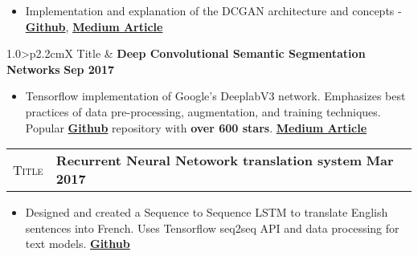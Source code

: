 \documentclass[9pt, a4paper, oneside, final]{scrartcl} %
\newcommand{\gray}{\rowcolor[gray]{.90}} %
\begin{document}

\begin{itemize}\itemsep1.2pt \parskip0pt 
\item Implementation and explanation of the DCGAN architecture and concepts - \textbf{\href{https://github.com/sthalles/blog-resources/tree/master/dcgan}{Github}}, \textbf{\href{https://medium.com/free-code-camp/an-intuitive-introduction-to-generative-adversarial-networks-gans-7a2264a81394}{Medium Article}} 
\end{itemize}

\begin{center}
\begin{tabularx}{1.0\linewidth}{>{\raggedleft\scshape}p{2.2cm}X}
\gray Title & \textbf{Deep Convolutional Semantic Segmentation Networks} \hfill \textbf{Sep 2017}\\
\end{tabularx}
\end{center}

\begin{itemize}\itemsep1.2pt \parskip0pt 
\item Tensorflow implementation of Google’s DeeplabV3 network. Emphasizes best practices of data pre-processing, augmentation, and training techniques. Popular \textbf{\href{https://github.com/sthalles/deeplab_v3}{Github}} repository with \textbf{over 600 stars}. \textbf{\href{https://medium.com/free-code-camp/diving-into-deep-convolutional-semantic-segmentation-networks-and-deeplab-v3-4f094fa387df?source=friends_link&sk=79233e6fd63ef6ea2578d5577eb00666}{Medium Article}}
\end{itemize}

\begin{center}
\begin{tabularx}{1.0\linewidth}{>{\raggedleft\scshape}p{2.2cm}X}
\gray Title & \textbf{Recurrent Neural Netowork translation system} \hfill \textbf{Mar 2017}\\
\end{tabularx}
\end{center}

\begin{itemize}\itemsep1.2pt \parskip0pt 
\item Designed and created a Sequence to Sequence LSTM to translate English sentences into French. Uses Tensorflow seq2seq API and data processing for text models. \textbf{\href{https://github.com/sthalles/neural_machine_translation}{Github}}
\end{itemize}
\end{document}
